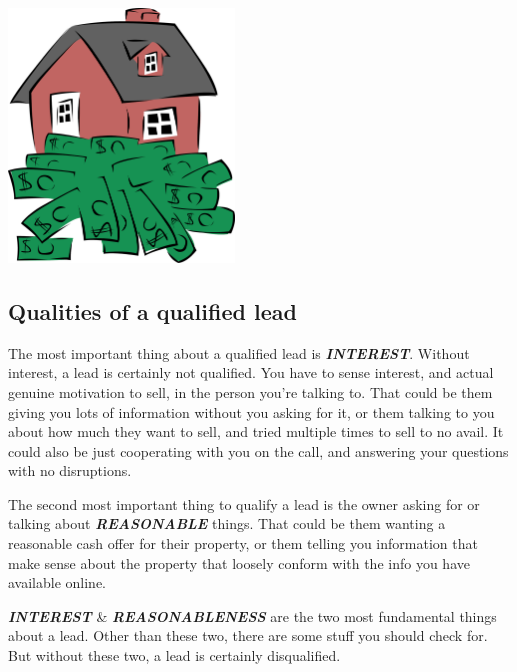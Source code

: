 \documentclass[12pt]{article}
\newcommand{\bb}[1]{\textbf{\textit{#1}}}
\begin{document}
\begin{center}
    \includegraphics[width=0.45\textwidth]{dollars.png}
\end{center}

\subsection{Qualities of a qualified lead}

    The most important thing about a qualified lead is \bb{INTEREST}. Without interest, a lead is certainly not qualified. You have to sense interest, and actual genuine motivation to sell, in the person you're talking to. That could be them giving you lots of information without you asking for it, or them talking to you about how much they want to sell, and tried multiple times to sell to no avail. It could also be just cooperating with you on the call, and answering your questions with no disruptions.\ \par

    The second most important thing to qualify a lead is the owner asking for or talking about \bb{REASONABLE} things. That could be them wanting a reasonable cash offer for their property, or them telling you information that make sense about the property that loosely conform with the info you have available online.\ \par
\vspace{2em}
\noindent
    \bb{INTEREST} \& \bb{REASONABLENESS} are the two most fundamental things about a lead. Other than these two, there are some stuff you should check for. But without these two, a lead is certainly disqualified.
\end{document}
